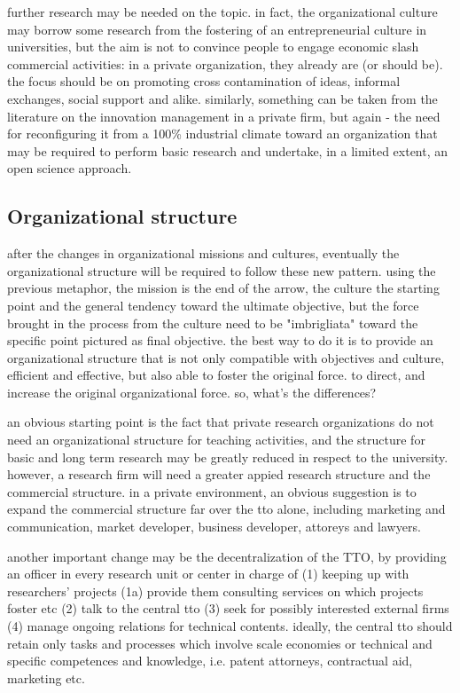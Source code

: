 further research may be needed on the topic. in fact, the organizational culture may borrow some research from the fostering of an entrepreneurial culture in universities, but the aim is not to convince people to engage economic slash commercial activities: in a private organization, they already are (or should be). the focus should be on promoting cross contamination of ideas, informal exchanges, social support and alike. similarly, something can be taken from the literature on the innovation management in a private firm, but again - the need for reconfiguring it from a 100\% industrial climate toward an organization that may be required to perform basic research and undertake, in a limited extent, an open science approach. 

\subsection{Organizational structure}

after the changes in organizational missions and cultures, eventually the organizational structure will be required to follow these new pattern. using the previous metaphor, the mission is the end of the arrow, the culture the starting point and the general tendency toward the ultimate objective, but the force brought in the process from the culture need to be "imbrigliata" toward the specific point pictured as final objective. the best way to do it is to provide an organizational structure that is not only compatible with objectives and culture, efficient and effective, but also able to foster the original force. to direct, and increase the original organizational force. so, what's the differences?

an obvious starting point is the fact that private research organizations do not need an organizational structure for teaching activities, and the structure for basic and long term research may be greatly reduced in respect to the university. however, a research firm will need a greater appied research structure and the commercial structure. in a private environment, an obvious suggestion is to expand the commercial structure far over the tto alone, including marketing and communication, market developer, business developer, attoreys and lawyers.

another important change may be the decentralization of the TTO, by providing an officer in every research unit or center in charge of (1) keeping up with researchers' projects (1a) provide them consulting services on which projects foster etc (2) talk to the central tto (3) seek for possibly interested external firms (4) manage ongoing relations for technical contents. ideally, the central tto should retain only tasks and processes which involve scale economies or technical and specific competences and knowledge, i.e. patent attorneys, contractual aid, marketing etc.

